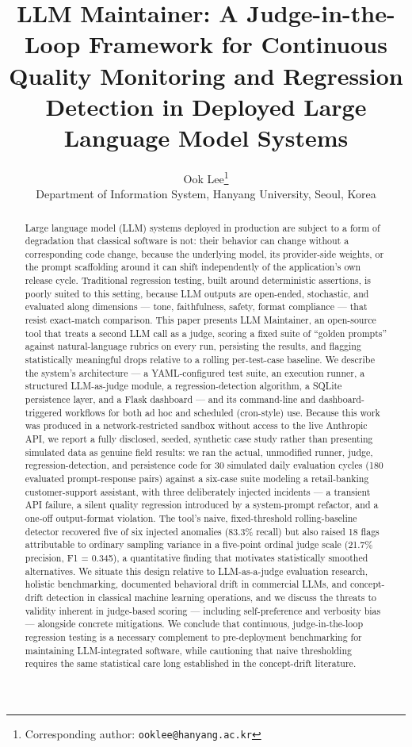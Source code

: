 \documentclass[11pt,a4paper]{article}
\title{LLM Maintainer: A Judge-in-the-Loop Framework for Continuous Quality Monitoring and Regression Detection in Deployed Large Language Model Systems}
\author{Ook Lee\thanks{Corresponding author: \texttt{ooklee@hanyang.ac.kr}}\\
\small Department of Information System, Hanyang University, Seoul, Korea}
\date{}
\begin{document}
\maketitle
\begin{abstract}
Large language model (LLM) systems deployed in production are subject to
a form of degradation that classical software is not: their behavior can
change without a corresponding code change, because the underlying
model, its provider-side weights, or the prompt scaffolding around it
can shift independently of the application's own release
cycle. Traditional regression testing, built around deterministic
assertions, is poorly suited to this setting, because LLM outputs are
open-ended, stochastic, and evaluated along dimensions --- tone,
faithfulness, safety, format compliance --- that resist exact-match
comparison. This paper presents LLM Maintainer, an open-source tool that
treats a second LLM call as a judge, scoring a fixed suite of ``golden
prompts'' against natural-language rubrics on every run, persisting the
results, and flagging statistically meaningful drops relative to a
rolling per-test-case baseline. We describe the system's
architecture --- a YAML-configured test suite, an execution runner, a
structured LLM-as-judge module, a regression-detection algorithm, a
SQLite persistence layer, and a Flask dashboard --- and its
command-line and dashboard-triggered workflows for both ad hoc and
scheduled (cron-style) use. Because this work was produced in a
network-restricted sandbox without access to the live Anthropic API, we
report a fully disclosed, seeded, synthetic case study rather than
presenting simulated data as genuine field results: we ran the actual,
unmodified runner, judge, regression-detection, and persistence code for
30 simulated daily evaluation cycles (180 evaluated prompt-response
pairs) against a six-case suite modeling a retail-banking
customer-support assistant, with three deliberately injected incidents
--- a transient API failure, a silent quality regression introduced by
a system-prompt refactor, and a one-off output-format violation. The
tool's naive, fixed-threshold rolling-baseline detector
recovered five of six injected anomalies (83.3\% recall) but also raised
18 flags attributable to ordinary sampling variance in a five-point
ordinal judge scale (21.7\% precision, F1 = 0.345), a quantitative
finding that motivates statistically smoothed alternatives. We situate
this design relative to LLM-as-a-judge evaluation research, holistic
benchmarking, documented behavioral drift in commercial LLMs, and
concept-drift detection in classical machine learning operations, and we
discuss the threats to validity inherent in judge-based scoring ---
including self-preference and verbosity bias --- alongside concrete
mitigations. We conclude that continuous, judge-in-the-loop regression
testing is a necessary complement to pre-deployment benchmarking for
maintaining LLM-integrated software, while cautioning that naive
thresholding requires the same statistical care long established in the
concept-drift literature.


\end{abstract}
\end{document}
